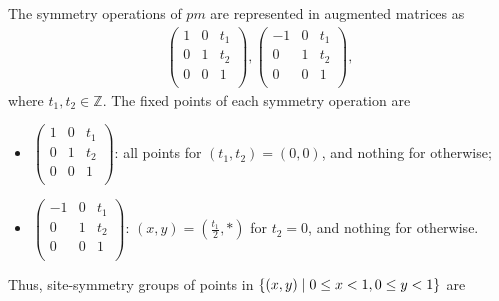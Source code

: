 The symmetry operations of $pm$ are represented in augmented matrices as
\begin{align*}
  \left(
    \begin{array}{cc|c}
        1 & 0 & t_{1} \\
        0 & 1 & t_{2} \\
        \hline
        0 & 0 & 1 \\
    \end{array}
  \right),
  \left(
    \begin{array}{cc|c}
        -1 & 0 & t_{1} \\
        0  & 1 & t_{2} \\
        \hline
        0 & 0 & 1 \\
    \end{array}
  \right),
\end{align*}
where $t_{1}, t_{2} \in \mathbb{Z}$.
The fixed points of each symmetry operation are
\begin{itemize}
  \item $\left(
    \begin{array}{cc|c}
        1 & 0 & t_{1} \\
        0 & 1 & t_{2} \\
        \hline
        0 & 0 & 1 \\
    \end{array}
  \right)$: all points for $(t_{1}, t_{2}) = (0, 0)$, and nothing for otherwise;
  \item $\left(
    \begin{array}{cc|c}
        -1 & 0 & t_{1} \\
        0  & 1 & t_{2} \\
        \hline
        0 & 0 & 1 \\
    \end{array}
  \right)$: $(x, y) = (\frac{t_{1}}{2}, \ast)$ for $t_{2} = 0$, and nothing for otherwise.
\end{itemize}
Thus, site-symmetry groups of points in $\left\{ (x, y) \mathrel{}\middle|\mathrel{}  0 \leq x < 1, 0 \leq y < 1 \right\}$ are
